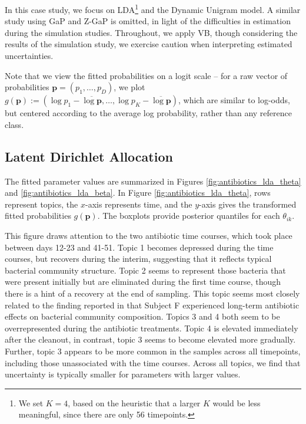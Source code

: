 \documentclass[oupdraft]{bio}
\begin{document}
In this case study, we focus on LDA\footnote{We set $K = 4$, based on the
  heuristic that a larger $K$ would be less meaningful, since there are only 56
  timepoints.} and the Dynamic Unigram model. A similar study using GaP and
Z-GaP is omitted, in light of the difficulties in estimation during the
simulation studies. Throughout, we apply VB, though considering the results of
the simulation study, we exercise caution when interpreting estimated
uncertainties.

Note that we view the fitted probabilities on a logit scale -- for a raw vector
of probabilities $\mathbf{p} = \left(p_{1}, \dots, p_{D}\right)$, we plot
$g\left(\mathbf{p}\right) := \left(\log p_{1} - \overline{\log \mathbf{p}}, \dots,
\log p_{K} - \overline{\log \mathbf{p}}\right)$, which are similar to log-odds,
but centered according to the average log probability, rather than any reference
class.

\subsection{Latent Dirichlet Allocation}
\label{sec:antibiotics_lda}

The fitted parameter values are summarized in Figures
\ref{fig:antibiotics_lda_theta} and \ref{fig:antibiotics_lda_beta}.
In Figure \ref{fig:antibiotics_lda_theta}, rows represent topics, the $x$-axis
represents time, and the $y$-axis gives the transformed fitted probabilities
$g\left(\mathbf{p}\right)$. The boxplots provide posterior quantiles for each
$\theta_{ik}$.

This figure draws attention to the two antibiotic time courses, which took place
between days 12-23 and 41-51. Topic 1 becomes depressed during the time courses,
but recovers during the interim, suggesting that it reflects typical bacterial
community structure. Topic 2 seems to represent those bacteria that were present
initially but are eliminated during the first time course, though there is a
hint of a recovery at the end of sampling. This topic seems most closely related
to the finding reported in \citep{dethlefsen2011incomplete} that Subject F
experienced long-term antibiotic effects on bacterial community composition.
Topics 3 and 4 both seem to be overrepresented during the antibiotic treatments.
Topic 4 is elevated immediately after the cleanout, in contrast, topic 3 seems
to become elevated more gradually. Further, topic 3 appears to be more common in
the samples across all timepoints, including those unassociated with the time
courses. Across all topics, we find that uncertainty is typically smaller for
parameters with larger values.
\end{document}
